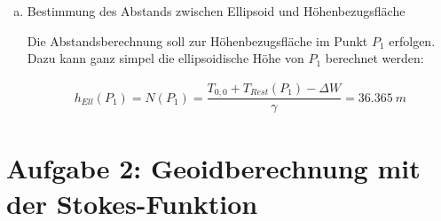 \begin{enumerate}[a)]
\item Bestimmung des Abstands zwischen Ellipsoid und Höhenbezugsfläche 

Die Abstandsberechnung soll zur Höhenbezugsfläche im Punkt $P_1$ erfolgen. Dazu kann ganz simpel die ellipsoidische Höhe von $P_1$ berechnet werden: 

\begin{gather*}
h_{Ell}(P_1) = N(P_1) = \dfrac{T_{0,0} + T_{Rest}(P_1) - \Delta W}{\gamma} = 36.365~m
\end{gather*}

\end{enumerate}

\section*{Aufgabe 2: Geoidberechnung mit der Stokes-Funktion}

